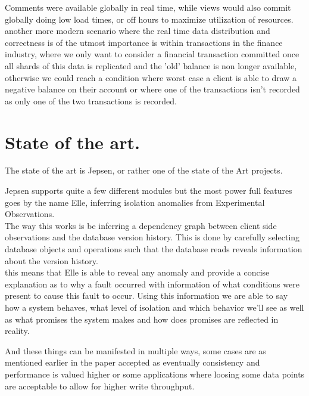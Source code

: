 \documentclass[a4paper,10pt,titlepage]{report}
\begin{document}
    Comments were available globally in real time, while views would also commit globally doing low load times, or off hours to maximize utilization of resources.\\
    \vspace{5mm}
    another more modern scenario where the real time data distribution and correctness is of the utmost importance is within transactions in the finance industry,  where we only want to consider a financial transaction committed once all shards of this data is replicated and the 'old' balance is non longer available, otherwise we could reach a condition where worst case a client is able to draw a negative balance on their account or where one of the transactions isn't recorded as only one of the two transactions is recorded.\\


    \section{State of the art.}

    The state of the art is Jepsen, or rather one of the state of the Art projects.

    Jepsen supports quite a few different modules but the most power full features goes by the name Elle, inferring isolation anomalies from Experimental Observations. \\
    \vspace{5mm}
    The way this works is be inferring a dependency graph between client side observations and the database version history. This is done by carefully selecting database objects and operations such that the database reads reveals information about the version history.\\
    \vspace{5mm}
    this means that Elle is able to reveal any anomaly and provide a concise explanation as to why a fault occurred with information of what conditions were present to cause this fault to occur. Using this information we are able to say how a system behaves, what level of isolation and which behavior we'll see as well as what promises the system makes and how does promises are reflected in reality.\\
    \vspace{5mm}

    And these things can be manifested in multiple ways, some cases are as mentioned earlier in the paper accepted as eventually consistency and performance is valued higher or some applications where loosing some data points are acceptable to allow for higher write throughput.\\
    \vspace{5mm}
\end{document}
